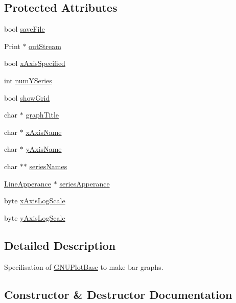 \subsection*{Protected Attributes}
\begin{DoxyCompactItemize}
\item 
bool \hyperlink{class_serial_graph_a24202e0a7a8bac5ec1cfd92bf796e078}{save\+File}
\item 
Print $\ast$ \hyperlink{class_serial_graph_aec32289a9393e98bf80d44406e5c207d}{out\+Stream}
\item 
bool \hyperlink{class_serial_graph_a4dbd9cf190c591fb4f2f46a50d937199}{x\+Axis\+Specified}
\item 
int \hyperlink{class_serial_graph_ab40c430e06102b9624736173d4a58596}{num\+Y\+Series}
\item 
bool \hyperlink{class_serial_graph_ad61d5ea29eacc1611c5addc94714f1e2}{show\+Grid}
\item 
char $\ast$ \hyperlink{class_serial_graph_a0b33d43c2bb54340ef1f90b5f76d7aea}{graph\+Title}
\item 
char $\ast$ \hyperlink{class_serial_graph_a5f5bf85ed361ff567d0888eaa73e269c}{x\+Axis\+Name}
\item 
char $\ast$ \hyperlink{class_serial_graph_a08452a56c74ec5f5473b64605d555339}{y\+Axis\+Name}
\item 
char $\ast$$\ast$ \hyperlink{class_serial_graph_a2307e40e27249f44bbe14776dc68c561}{series\+Names}
\item 
\hyperlink{struct_line_apperance}{Line\+Apperance} $\ast$ \hyperlink{class_serial_graph_a8d743f9eeeca69a988d2159a405e4253}{series\+Apperance}
\item 
byte \hyperlink{class_serial_graph_afc2ca72fdfe2bc5e3159c9e910a8f81e}{x\+Axis\+Log\+Scale}
\item 
byte \hyperlink{class_serial_graph_a1f0424857ec14c176747b3ddb0768eee}{y\+Axis\+Log\+Scale}
\end{DoxyCompactItemize}


\subsection{Detailed Description}
Specilisation of \hyperlink{class_g_n_u_plot_base}{G\+N\+U\+Plot\+Base} to make bar graphs. 

\subsection{Constructor \& Destructor Documentation}
\hypertarget{class_g_n_u_plot_bar_graph_ad1e03b9c837e0f6cf9572fcd188ab587}{}
